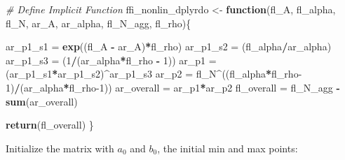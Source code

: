\documentclass[
]{book}
\newenvironment{Shaded}{\begin{snugshade}}{\end{snugshade}}
\newcommand{\CommentTok}[1]{\textcolor[rgb]{0.56,0.35,0.01}{\textit{#1}}}
\newcommand{\ControlFlowTok}[1]{\textcolor[rgb]{0.13,0.29,0.53}{\textbf{#1}}}
\newcommand{\DecValTok}[1]{\textcolor[rgb]{0.00,0.00,0.81}{#1}}
\newcommand{\KeywordTok}[1]{\textcolor[rgb]{0.13,0.29,0.53}{\textbf{#1}}}
\newcommand{\NormalTok}[1]{#1}
\newcommand{\OperatorTok}[1]{\textcolor[rgb]{0.81,0.36,0.00}{\textbf{#1}}}
\newcommand{\StringTok}[1]{\textcolor[rgb]{0.31,0.60,0.02}{#1}}
\begin{document}
\begin{Shaded}
\begin{Highlighting}[]
\CommentTok{# Define Implicit Function}
\NormalTok{ffi_nonlin_dplyrdo <-}\StringTok{ }\ControlFlowTok{function}\NormalTok{(fl_A, fl_alpha, fl_N, ar_A, ar_alpha, fl_N_agg, fl_rho)\{}

\NormalTok{  ar_p1_s1 =}\StringTok{ }\KeywordTok{exp}\NormalTok{((fl_A }\OperatorTok{-}\StringTok{ }\NormalTok{ar_A)}\OperatorTok{*}\NormalTok{fl_rho)}
\NormalTok{  ar_p1_s2 =}\StringTok{ }\NormalTok{(fl_alpha}\OperatorTok{/}\NormalTok{ar_alpha)}
\NormalTok{  ar_p1_s3 =}\StringTok{ }\NormalTok{(}\DecValTok{1}\OperatorTok{/}\NormalTok{(ar_alpha}\OperatorTok{*}\NormalTok{fl_rho }\OperatorTok{-}\StringTok{ }\DecValTok{1}\NormalTok{))}
\NormalTok{  ar_p1 =}\StringTok{ }\NormalTok{(ar_p1_s1}\OperatorTok{*}\NormalTok{ar_p1_s2)}\OperatorTok{^}\NormalTok{ar_p1_s3}
\NormalTok{  ar_p2 =}\StringTok{ }\NormalTok{fl_N}\OperatorTok{^}\NormalTok{((fl_alpha}\OperatorTok{*}\NormalTok{fl_rho}\DecValTok{-1}\NormalTok{)}\OperatorTok{/}\NormalTok{(ar_alpha}\OperatorTok{*}\NormalTok{fl_rho}\DecValTok{-1}\NormalTok{))}
\NormalTok{  ar_overall =}\StringTok{ }\NormalTok{ar_p1}\OperatorTok{*}\NormalTok{ar_p2}
\NormalTok{  fl_overall =}\StringTok{ }\NormalTok{fl_N_agg }\OperatorTok{-}\StringTok{ }\KeywordTok{sum}\NormalTok{(ar_overall)}

  \KeywordTok{return}\NormalTok{(fl_overall)}
\NormalTok{\}}
\end{Highlighting}
\end{Shaded}

Initialize the matrix with \(a_0\) and \(b_0\), the initial min and max points:
\end{document}
